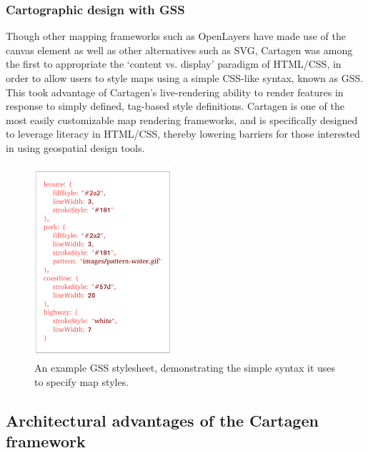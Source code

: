 \documentclass[11pt,oneside,notitlepage]{report}
\begin{document}
\subsubsection{Cartographic design with \ac{GSS}}

Though other mapping frameworks such as OpenLayers have made use of the canvas element as well as other alternatives such as \ac{SVG}, Cartagen was among the first to appropriate the `content vs. display' paradigm of HTML/CSS, in order to allow users to style maps using a simple CSS-like syntax, known as \ac{GSS}. This took advantage of Cartagen's live-rendering ability to render features in response to simply defined, tag-based style definitions. Cartagen is one of the most easily customizable map rendering frameworks, and is specifically designed to leverage literacy in HTML/CSS, thereby lowering barriers for those interested in using geospatial design tools. 

\begin{figure}
	\begin{flushright}
		\includegraphics[width=0.45\textwidth]{images/gss.pdf}
		\caption{An example \ac{GSS} stylesheet, demonstrating the simple syntax it uses to specify map styles.}
	\end{flushright}
\end{figure}

\subsection{Architectural advantages of the Cartagen framework}
\end{document}

